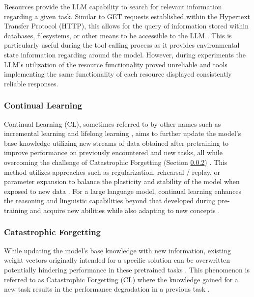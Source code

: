 Resources provide the LLM capability to search for relevant information
regarding a given task. Similar to GET requests established within the Hypertext
Transfer Protocol (HTTP), this allows for the query of information stored within
databases, filesystems, or other means to be accessible to the LLM
\cite{hou_model_2025, ehtesham_survey_2025}. This is particularly useful during
the tool calling process as it provides environmental state information
regarding around the model. However, during experiments the LLM's utilization of
the resource functionality proved unreliable and tools implementing the same
functionality of each resource displayed consistently reliable responses.

\subsubsection{Continual Learning}
Continual Learning (CL), sometimes referred to by other names such as
incremental learning \cite{wang_comprehensive_2024} and lifelong learning
\cite{kumarappan_leanagent_2025, parisi_lifelong_2018, dautume_episodic_2019},
aims to further update the model's base knowledge utilizing new streams of data
obtained after pretraining to improve performance on previously encountered and
new tasks, all while overcoming the challenge of Catastrophic Forgetting
(Section \ref{sec:catastrophic_forgetting}) \cite{scialom_fine-tuned_2022,
wu_continual_2024, wang_comprehensive_2024, jang_towards_2021,
ven_generative_2018, lopez-paz_gradient_2017}. This method utilizes approaches
such as regularization, rehearsal / replay, or parameter expansion to balance
the plasticity and stability of the model when exposed to new data
\cite{wang_comprehensive_2024, kirkpatrick_overcoming_2017, jang_towards_2021,
rusu_progressive_2022}. For a large language model, continual learning enhances
the reasoning and linguistic capabilities beyond that developed during
pre-training and acquire new abilities while also adapting to new concepts
\cite{scialom_fine-tuned_2022, jang_towards_2021}.

\subsubsection{Catastrophic Forgetting}
\label{sec:catastrophic_forgetting}
While updating the model's base knowledge with new information, existing weight
vectors originally intended for a specific solution can be overwritten
potentially hindering performance in these pretrained tasks
\cite{mccloskey_catastrophic_1989, ratcliff_connectionist_1990,
french_catastrophic_1999}. This phenomenon is referred to as Catastrophic
Forgetting (CL) where the knowledge gained for a new task results in the
performance degradation in a previous task \cite{french_catastrophic_1999,
kirkpatrick_overcoming_2017, zeng_dirichlet_2024, mccloskey_catastrophic_1989,
ratcliff_connectionist_1990}.

